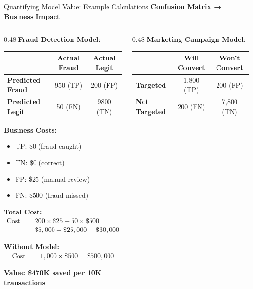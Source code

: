 \begin{frame}{Quantifying Model Value: Example Calculations}
\textbf{Confusion Matrix → Business Impact}

\begin{columns}
\begin{column}{0.48\textwidth}
\textbf{Fraud Detection Model:}
\begin{table}
\tiny
\begin{tabular}{lcc}
\toprule
& \textbf{Actual Fraud} & \textbf{Actual Legit} \\
\midrule
\textbf{Predicted Fraud} & 950 (TP) & 200 (FP) \\
\textbf{Predicted Legit} & 50 (FN) & 9800 (TN) \\
\bottomrule
\end{tabular}
\end{table}

\textbf{Business Costs:}
\begin{itemize}
\item TP: \$0 (fraud caught)
\item TN: \$0 (correct)
\item FP: \$25 (manual review)
\item FN: \$500 (fraud missed)
\end{itemize}

\textbf{Total Cost:}
\begin{align*}
\text{Cost} &= 200 \times \$25 + 50 \times \$500 \\
&= \$5,000 + \$25,000 = \$30,000
\end{align*}

\textbf{Without Model:}
\begin{align*}
\text{Cost} &= 1,000 \times \$500 = \$500,000
\end{align*}

\textcolor{forest}{\textbf{Value: \$470K saved per 10K transactions}}
\end{column}

\begin{column}{0.48\textwidth}
\textbf{Marketing Campaign Model:}
\begin{table}
\tiny
\begin{tabular}{lcc}
\toprule
& \textbf{Will Convert} & \textbf{Won't Convert} \\
\midrule
\textbf{Targeted} & 1,800 (TP) & 200 (FP) \\
\textbf{Not Targeted} & 200 (FN) & 7,800 (TN) \\
\bottomrule
\end{tabular}
\end{table}


\end{column}
\end{columns}
\end{frame}
